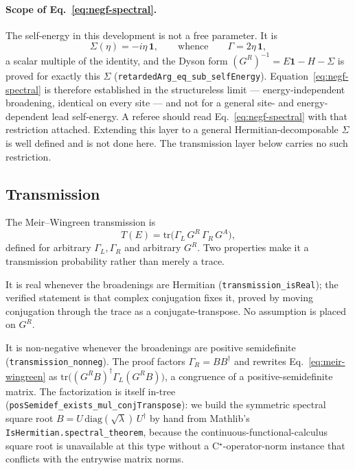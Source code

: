 \documentclass[aps,prd,reprint,nofootinbib,superscriptaddress]{revtex4-2}
\newcommand{\thm}[1]{\texttt{#1}}   %
\begin{document}
\paragraph{Scope of Eq.~\eqref{eq:negf-spectral}.}
The self-energy in this development is not a free parameter. It is
\begin{equation}
\Sigma(\eta) = -i\eta\,\mathbf{1},
\qquad\text{whence}\qquad
\Gamma = 2\eta\,\mathbf{1},
\label{eq:negf-selfenergy}
\end{equation}
a scalar multiple of the identity, and the Dyson form $(G^{R})^{-1}=E\mathbf{1}-H-\Sigma$ is proved
for exactly this $\Sigma$ (\thm{retardedArg\_eq\_sub\_selfEnergy}). Equation~\eqref{eq:negf-spectral}
is therefore established in the structureless limit --- energy-independent broadening, identical on
every site --- and not for a general site- and energy-dependent lead self-energy. A referee should
read Eq.~\eqref{eq:negf-spectral} with that restriction attached. Extending this layer to a general
Hermitian-decomposable $\Sigma$ is well defined and is not done here. The transmission layer below
carries no such restriction.

\subsection{Transmission}

The Meir--Wingreen transmission is
\begin{equation}
T(E) = \mathrm{tr}\bigl(\Gamma_{L}\,G^{R}\,\Gamma_{R}\,G^{A}\bigr),
\label{eq:meir-wingreen}
\end{equation}
defined for arbitrary $\Gamma_{L},\Gamma_{R}$ and arbitrary $G^{R}$. Two properties make it a
transmission probability rather than merely a trace.

It is real whenever the broadenings are Hermitian (\thm{transmission\_isReal}); the verified
statement is that complex conjugation fixes it, proved by moving conjugation through the trace as a
conjugate-transpose. No assumption is placed on $G^{R}$.

It is non-negative whenever the broadenings are positive semidefinite
(\thm{transmission\_nonneg}). The proof factors $\Gamma_{R}=BB^{\dagger}$ and rewrites
Eq.~\eqref{eq:meir-wingreen} as $\mathrm{tr}\bigl((G^{R}B)^{\dagger}\Gamma_{L}(G^{R}B)\bigr)$, a
congruence of a positive-semidefinite matrix. The factorization is itself in-tree
(\thm{posSemidef\_exists\_mul\_conjTranspose}): we build the symmetric spectral square root
$B=U\,\mathrm{diag}(\sqrt{\lambda})\,U^{\dagger}$ by hand from Mathlib's
\texttt{IsHermitian.spectral\_theorem}, because the continuous-functional-calculus square root is
unavailable at this type without a C$^{\star}$-operator-norm instance that conflicts with the
entrywise matrix norms.
\end{document}
